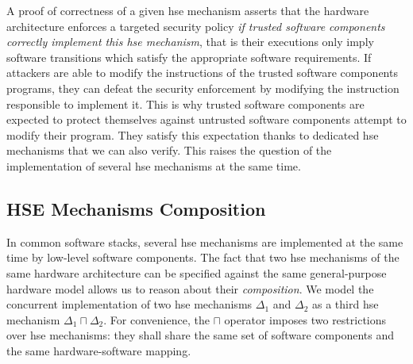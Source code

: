 A proof of correctness of a given \ac{hse} mechanism asserts that the
hardware architecture enforces a targeted security policy \emph{if trusted
  software components correctly implement this \ac{hse} mechanism}, that is
their executions only imply software transitions which satisfy the appropriate
software requirements.
%
If attackers are able to modify the instructions of the trusted software
components programs, they can defeat the security enforcement by
modifying the instruction responsible to implement it. 
%
This is why trusted software components are expected to protect themselves
against untrusted software components attempt to modify their program.
%
They satisfy this expectation thanks to dedicated \ac{hse} mechanisms that we
can also verify.
%
This raises the question of the implementation of several \ac{hse} mechanisms at
the same time.

\subsection{HSE Mechanisms Composition}
\label{subsec:speccert:compo}

In common software stacks, several \ac{hse} mechanisms are implemented at the
same time by low-level software components.
%
The fact that two \ac{hse} mechanisms of the same hardware architecture can be
specified against the same general-purpose hardware model allows us to reason
about their \emph{composition}.
%
We model the concurrent implementation of two \ac{hse} mechanisms \( \Delta_1 \)
and \( \Delta_2 \) as a third \ac{hse} mechanism \( \Delta_1 \sqcap \Delta_2 \).
%
For convenience, the \( \sqcap \) operator imposes two restrictions over
\ac{hse} mechanisms: they shall share the same set of software components and
the same hardware-software mapping.

